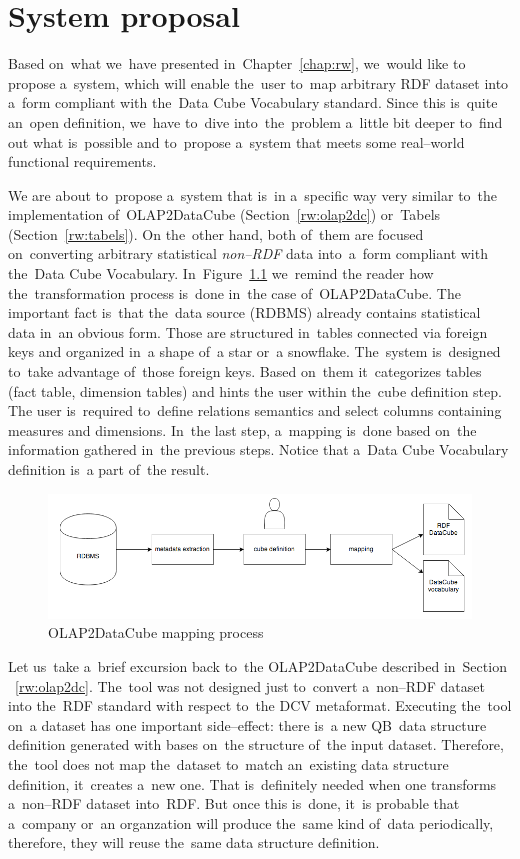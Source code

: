 \chapter{System proposal}
\label{ch:proposal}
Based on~what we~have presented in~Chapter~\ref{chap:rw}, we~would like to
propose a~system, which will enable the~user to~map arbitrary RDF dataset
into a~form compliant with the~Data Cube Vocabulary standard. Since this is~quite an~open definition, we~have to~dive into~the~problem a~little bit deeper to~find out what is~possible and to~propose a~system that meets some real--world 
functional requirements.

We are about to~propose a~system that is~in a~specific way very similar to~the implementation of~OLAP2DataCube (Section~\ref{rw:olap2dc}) or~Tabels (Section~\ref{rw:tabels}).
On the~other hand, both of~them are 
focused on~converting arbitrary statistical \emph{non--RDF} data into~a~form 
compliant with the~Data Cube Vocabulary. In~Figure~\ref{fig:olap2dc-mapping} we~remind
the reader how the~transformation process is~done in~the case of~OLAP2DataCube.
The important fact is~that the~data source (RDBMS) already contains statistical data in~an obvious form. 
Those are structured in~tables connected via foreign keys and organized in~a 
shape of~a star or~a snowflake. The~system is~designed to~take advantage of~those 
foreign keys. Based on~them it~categorizes tables (fact table, dimension tables) and hints
the user within the~cube definition step.
The user is~required to~define relations semantics and select columns 
containing measures and dimensions. In~the last step, a~mapping is~done based on~the information gathered in~the previous steps.
Notice that a~Data Cube Vocabulary definition is~a part of~the result.


\begin{figure}
	\centering
	\includegraphics[width=140mm]{img/mapping-olap2dc.png}
	\caption{OLAP2DataCube mapping process}
	\label{fig:olap2dc-mapping}
\end{figure}


Let us~take a~brief excursion back to~the OLAP2DataCube described in~Section 
~\ref{rw:olap2dc}. The~tool was not designed just to~convert a~non--RDF dataset 
into the~RDF standard with respect to~the DCV metaformat. Executing the~tool on~a 
dataset has one important side--effect: there is~a new QB~data structure definition
generated with bases on~the structure of~the input dataset. Therefore, the~tool does not map the~dataset to~match an~existing data structure definition, it~creates a~new one. That is~definitely
needed when one transforms a~non--RDF dataset into~RDF. But once 
this is~done, it~is probable that a~company or~an organzation will produce the~same kind of~data periodically, therefore, they will reuse the~same data structure definition.

